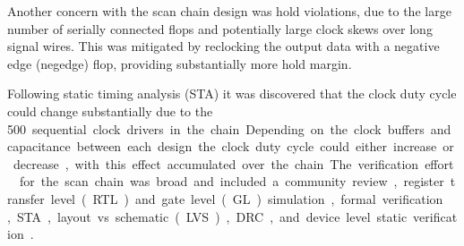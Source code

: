 Another concern with the scan chain design was hold violations, due to the large number of serially connected flops and potentially large clock skews over long signal wires. This was mitigated by reclocking the output data with a negative edge (negedge) flop, providing substantially more hold margin.

Following static timing analysis (STA) it was discovered that the clock duty cycle could change substantially due to the \qty{500} sequential clock drivers in the chain. Depending on the clock buffers and capacitance between each design the clock duty cycle could either increase or decrease, with this effect accumulated over the chain.

The verification effort~\cite{verificationmd} for the scan chain was broad and included a community review, register transfer level (RTL) and gate level (GL) simulation, formal verification\cite{sby}, STA, layout vs. schematic (LVS), DRC, and device level static verification~\cite{cvc}.
